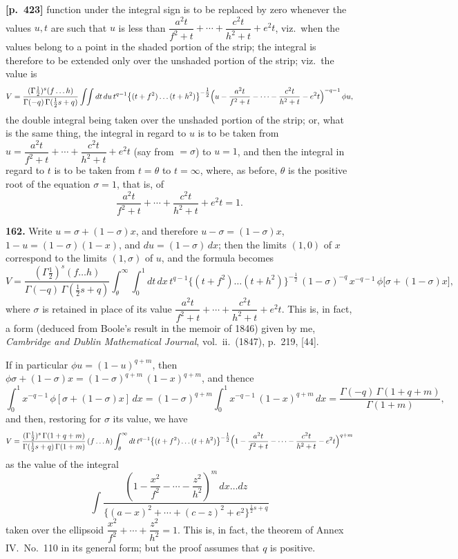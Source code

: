\documentclass[11pt,a4paper]{article}
\begin{document}
\bigskip
\noindent\textbf{[p.~423]}\quad
function under the integral sign is to be replaced by zero whenever the values $u,t$ are such that $u$ is less than $\dfrac{a^{2}t}{f^{2}+t} + \cdots + \dfrac{c^{2}t}{h^{2}+t} + e^{2}t$, viz.\ when the values belong to a point in the shaded portion of the strip; the integral is therefore to be extended only over the unshaded portion of the strip; viz.\ the value is
\[
V = \frac{(\Gamma\tfrac{1}{2})^{s}(f\ldots h)}{\Gamma(-q)\,\Gamma(\tfrac{1}{2}s+q)}\int\!\!\int dt\,du\,t^{q-1}\bigl\{(t+f^{2})\ldots(t+h^{2})\bigr\}^{-\tfrac{1}{2}}\Bigl(u - \frac{a^{2}t}{f^{2}+t} - \cdots - \frac{c^{2}t}{h^{2}+t} - e^{2}t\Bigr)^{-q-1}\,\phi u,
\]
the double integral being taken over the unshaded portion of the strip; or, what is the same thing, the integral in regard to $u$ is to be taken from $u = \dfrac{a^{2}t}{f^{2}+t} + \cdots + \dfrac{c^{2}t}{h^{2}+t} + e^{2}t$ (say from $= \sigma$) to $u = 1$, and then the integral in regard to $t$ is to be taken from $t = \theta$ to $t = \infty$, where, as before, $\theta$ is the positive root of the equation $\sigma = 1$, that is, of
\[
\frac{a^{2}t}{f^{2}+t} + \cdots + \frac{c^{2}t}{h^{2}+t} + e^{2}t = 1.
\]

\textbf{162.} Write $u = \sigma + (1-\sigma)x$, and therefore $u - \sigma = (1-\sigma)x$, $1 - u = (1-\sigma)(1-x)$, and $du = (1-\sigma)\,dx$; then the limits $(1,0)$ of $x$ correspond to the limits $(1,\sigma)$ of $u$, and the formula becomes
\[
V = \frac{(\Gamma\tfrac{1}{2})^{s}(f\ldots h)}{\Gamma(-q)\,\Gamma(\tfrac{1}{2}s+q)}\int_{\theta}^{\infty}\!\!\int_{0}^{1} dt\,dx\,t^{q-1}\bigl\{(t+f^{2})\ldots(t+h^{2})\bigr\}^{-\tfrac{1}{2}}\,(1-\sigma)^{-q}\,x^{-q-1}\,\phi\bigl[\sigma+(1-\sigma)x\bigr],
\]
where $\sigma$ is retained in place of its value $\dfrac{a^{2}t}{f^{2}+t} + \cdots + \dfrac{c^{2}t}{h^{2}+t} + e^{2}t$. This is, in fact, a form (deduced from Boole's result in the memoir of 1846) given by me, \textit{Cambridge and Dublin Mathematical Journal}, vol.\ ii.\ (1847), p.~219, [44].

If in particular $\phi u = (1-u)^{q+m}$, then $\phi\sigma + (1-\sigma)x = (1-\sigma)^{q+m}\,(1-x)^{q+m}$, and thence
\[
\int_{0}^{1} x^{-q-1}\,\phi[\sigma+(1-\sigma)x]\,dx = (1-\sigma)^{q+m}\int_{0}^{1} x^{-q-1}\,(1-x)^{q+m}\,dx = \frac{\Gamma(-q)\,\Gamma(1+q+m)}{\Gamma(1+m)},
\]
and then, restoring for $\sigma$ its value, we have
\[
V = \frac{(\Gamma\tfrac{1}{2})^{s}\,\Gamma(1+q+m)}{\Gamma(\tfrac{1}{2}s+q)\,\Gamma(1+m)}\,(f\ldots h)\int_{\theta}^{\infty} dt\,t^{q-1}\bigl\{(t+f^{2})\ldots(t+h^{2})\bigr\}^{-\tfrac{1}{2}}\Bigl(1 - \frac{a^{2}t}{f^{2}+t} - \cdots - \frac{c^{2}t}{h^{2}+t} - e^{2}t\Bigr)^{q+m}
\]
as the value of the integral
\[
\int \frac{(1 - \dfrac{x^{2}}{f^{2}} - \cdots - \dfrac{z^{2}}{h^{2}})^{m}\,dx\ldots dz}{\{(a-x)^{2}+\cdots+(c-z)^{2}+e^{2}\}^{\tfrac{1}{2}s+q}}
\]
taken over the ellipsoid $\dfrac{x^{2}}{f^{2}} + \cdots + \dfrac{z^{2}}{h^{2}} = 1$. This is, in fact, the theorem of Annex IV.\ No.\ 110 in its general form; but the proof assumes that $q$ is positive.
\end{document}
